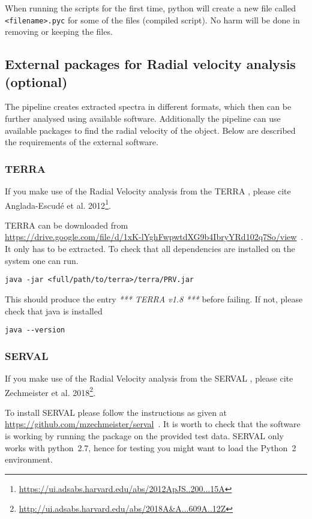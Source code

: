\documentclass[10pt,a4paper]{article}
\begin{document}
When running the scripts for the first time, python will create a new file called \verb|<filename>.pyc| for some of the files (compiled script). No harm will be done in removing or keeping the files.

\subsection{External packages for Radial velocity analysis (optional)}
\label{Sec:RV_packages}
The pipeline creates extracted spectra in different formats, which then can be further analysed using available software. Additionally the pipeline can use available packages to find the radial velocity of the object. Below are described the requirements of the external software.

\subsubsection{TERRA}
If you make use of the Radial Velocity analysis from the TERRA , please cite Anglada-Escud{\'e} et al. 2012\footnote{\url{https://ui.adsabs.harvard.edu/abs/2012ApJS..200...15A}}.

TERRA can be downloaded from\\ \url{https://drive.google.com/file/d/1xK-lYghFwpwtdXG9b4IbryYRd102q7So/view}~. It only has to be extracted. To check that all dependencies are installed on the system one can run.
\begin{lstlisting}[style=base]
java -jar <full/path/to/terra>/terra/PRV.jar
\end{lstlisting}
This should produce the entry \textit{*** TERRA v1.8 ***} before failing. If not, please check that java is installed
\begin{lstlisting}[style=base]
java --version
\end{lstlisting}

\subsubsection{SERVAL}
\label{Section:serval_package}
If you make use of the Radial Velocity analysis from the SERVAL , please cite Zechmeister et al. 2018\footnote{\url{http://ui.adsabs.harvard.edu/abs/2018A&A...609A..12Z}}.

To install SERVAL please follow the instructions as given at\\ \url{https://github.com/mzechmeister/serval}~. It is worth to check that the software is working by running the package on the provided test data. SERVAL only works with python~2.7, hence for testing you might want to load the Python~2 environment.
\end{document}
